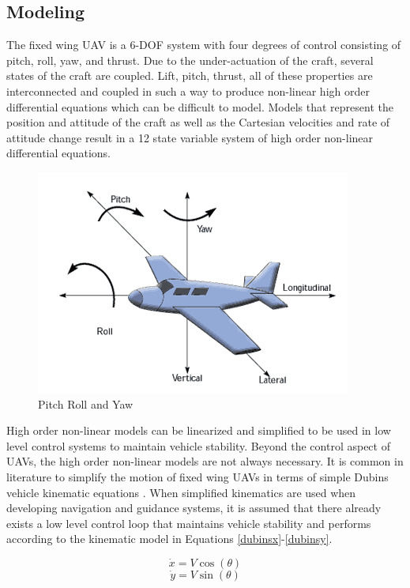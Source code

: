 \documentclass[numbered,pdftex]{ohio-etd}
\begin{document}
\subsection{Modeling}
The fixed wing UAV is a 6-DOF system with four degrees of control consisting of pitch, roll, yaw, and thrust. Due to the under-actuation of the craft, several states of the craft are coupled. Lift, pitch, thrust, all of these properties are interconnected and coupled in such a way to produce non-linear high order differential equations which can be difficult to model. Models that represent the position and attitude of the craft as well as the Cartesian velocities and rate of attitude change result in a 12 state variable system of high order non-linear differential equations. 

\begin{figure}[h]
	\centering
	\includegraphics[width=0.7\linewidth]{PaperFigures/pitchrollyaw}
	\caption{Pitch Roll and Yaw}
	\label{fig:pitchrollyaw}
\end{figure}

High order non-linear models can be linearized and simplified to be used in low level control systems to maintain vehicle stability. Beyond the control aspect of UAVs, the high order non-linear models are not always necessary. It is common in literature to simplify the motion of fixed wing UAVs in terms of simple Dubins vehicle kinematic equations \cite{chen_tracking_2009} \cite{liang_tangent_2017} \cite{nelson_cooperative_2005} \cite{griffiths_vector_2006} \cite{jung_unmanned_2016}. When simplified kinematics are used when developing navigation and guidance systems, it is assumed that there already exists a low level control loop that maintains vehicle stability and performs according to the kinematic model in Equations \ref{dubinsx}-\ref{dubinsy}.

 \begin{equation}
 \label{dubinsx}
 \dot{x} = V\cos(\theta)
 \end{equation}
  \begin{equation}
  \label{dubinsy}
 \dot{y} = V\sin(\theta)
 \end{equation}
\end{document}
